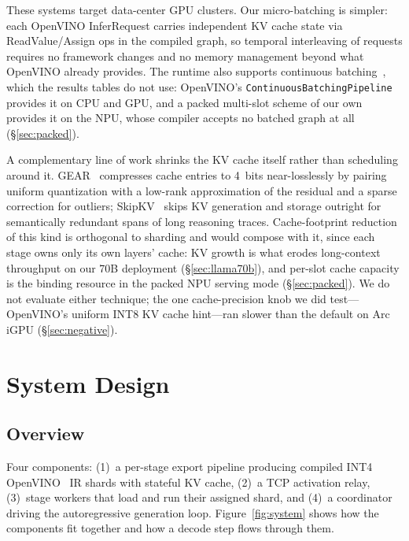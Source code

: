 \documentclass[11pt]{article}
\begin{document}
These systems target data-center GPU clusters. Our micro-batching is simpler: each OpenVINO InferRequest carries independent KV cache state via ReadValue/Assign ops in the compiled graph, so temporal interleaving of requests requires no framework changes and no memory management beyond what OpenVINO already provides. The runtime also supports continuous batching~\cite{yu2022orca}, which the results tables do not use: OpenVINO's \texttt{ContinuousBatchingPipeline} provides it on CPU and GPU, and a packed multi-slot scheme of our own provides it on the NPU, whose compiler accepts no batched graph at all (\S\ref{sec:packed}).

A complementary line of work shrinks the KV cache itself rather than scheduling around it. GEAR~\cite{kang2024gear} compresses cache entries to 4~bits near-losslessly by pairing uniform quantization with a low-rank approximation of the residual and a sparse correction for outliers; SkipKV~\cite{tian2025skipkv} skips KV generation and storage outright for semantically redundant spans of long reasoning traces. Cache-footprint reduction of this kind is orthogonal to sharding and would compose with it, since each stage owns only its own layers' cache: KV growth is what erodes long-context throughput on our 70B deployment (\S\ref{sec:llama70b}), and per-slot cache capacity is the binding resource in the packed NPU serving mode (\S\ref{sec:packed}). We do not evaluate either technique; the one cache-precision knob we did test---OpenVINO's uniform INT8 KV cache hint---ran slower than the default on Arc iGPU (\S\ref{sec:negative}).

\section{System Design}
\label{sec:design}

\subsection{Overview}
\label{sec:overview}

Four components: (1)~a per-stage export pipeline producing compiled INT4 OpenVINO~\cite{openvino2026} IR shards with stateful KV cache, (2)~a TCP activation relay, (3)~stage workers that load and run their assigned shard, and (4)~a coordinator driving the autoregressive generation loop. Figure~\ref{fig:system} shows how the components fit together and how a decode step flows through them.
\end{document}
